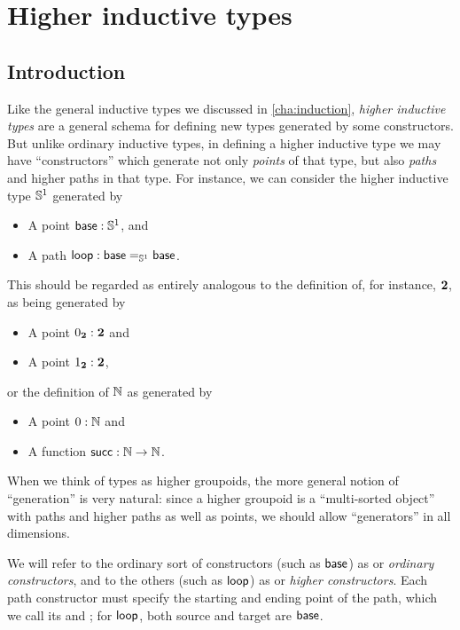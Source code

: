 \chapter{Higher inductive types}
\label{cha:hits}

%
%
%

\section{Introduction}
\label{sec:intro-hits}


Like the general inductive types we discussed in \cref{cha:induction}, \emph{higher inductive types} are a general schema for defining new types generated by some constructors.
But unlike ordinary inductive types, in defining a higher inductive type we may have ``constructors'' which generate not only \emph{points} of that type, but also \emph{paths} and higher paths in that type.
%
%
For instance, we can consider the higher inductive type $\Sn^1$ generated by
\begin{itemize}
\item A point $\base:\Sn^1$, and
\item A path $\lloop : {\id[\Sn^1]\base\base}$.
\end{itemize}
This should be regarded as entirely analogous to the definition of, for instance, $\bool$, as being generated by
\begin{itemize}
\item A point $\bfalse:\bool$ and
\item A point $\btrue:\bool$,
\end{itemize}
or the definition of $\nat$ as generated by
\begin{itemize}
\item A point $0:\nat$ and
\item A function $\suc:\nat\to\nat$.
\end{itemize}
When we think of types as higher groupoids, the more general notion of ``generation'' is very natural:
since a higher groupoid is a ``multi-sorted object'' with paths and higher paths as well as points, we should allow ``generators'' in all dimensions.

We will refer to the ordinary sort of constructors (such as $\base$) as 
%
%
or \emph{ordinary constructors}, and to the others (such as $\lloop$) as 
%
%
or \emph{higher constructors}.
Each path constructor must specify the starting and ending point of the path, which we call its 
%
and ;
%
for $\lloop$, both source and target are $\base$.

